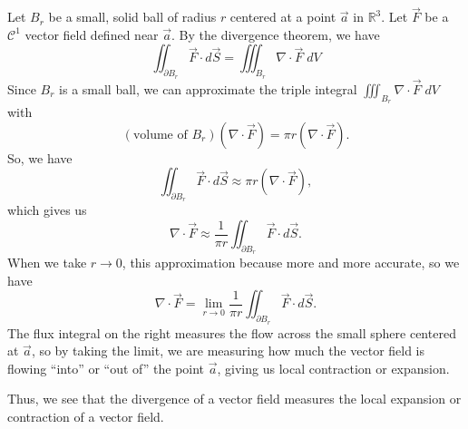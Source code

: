 \documentclass{ximera}
\begin{document}
Let $B_r$ be a small, solid ball of radius $r$ centered at a point $\vec{a}$ in $\mathbb{R}^3$. Let $\vec{F}$ be a $\mathcal{C}^1$ vector field defined near $\vec{a}$. By the divergence theorem, we have
\[
\iint_{\partial B_r} \vec{F}\cdot d\vec{S} = \iiint_{B_r} \nabla\cdot \vec{F}\;dV
\]
Since $B_r$ is a small ball, we can approximate the triple integral $\iiint_{B_r} \nabla\cdot \vec{F}\;dV$ with
\[
(\text{volume of }B_r)\left(\nabla\cdot \vec{F}\right) = \pi r \left(\nabla\cdot \vec{F}\right) .
\]
So, we have
\[
\iint_{\partial B_r} \vec{F}\cdot d\vec{S} \approx \pi r \left(\nabla\cdot \vec{F}\right),
\]
which gives us 
\[
\nabla\cdot \vec{F} \approx \frac{1}{\pi r}\iint_{\partial B_r} \vec{F}\cdot d\vec{S}.
\]
When we take $r\rightarrow 0$, this approximation because more and more accurate, so we have
\[
\nabla\cdot \vec{F} = \lim_{r\rightarrow 0} \frac{1}{\pi r}\iint_{\partial B_r} \vec{F}\cdot d\vec{S}.
\]
The flux integral on the right measures the flow across the small sphere centered at $\vec{a}$, so by taking the limit, we are measuring how much the vector field is flowing ``into'' or ``out of'' the point $\vec{a}$, giving us local contraction or expansion.

Thus, we see that the divergence of a vector field measures the local expansion or contraction of a vector field.
\end{document}
